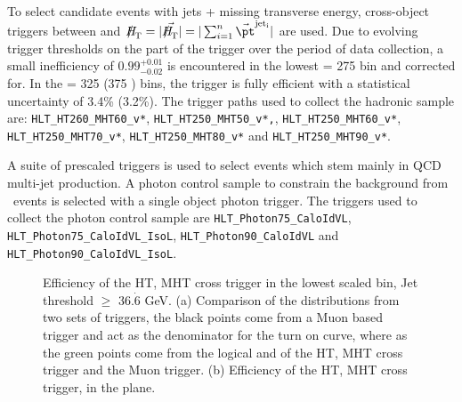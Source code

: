 To select candidate events with jets + missing transverse energy,
cross-object triggers between \HT and $\mht = |\vec{\mht}| =
|\sum_{i=1}^{n} \vec{\pt}^{\rm jet_i}|$ are used.  Due to evolving
trigger thresholds on the \mht part of the trigger over the period of
data collection, a small inefficiency of $0.99^{+0.01}_{-0.02} $ is
encountered in the lowest \HT = 275 \gev bin and corrected for.  In
the \HT = 325 \gev (375 \gev) bins, the trigger is fully efficient
with a statistical uncertainty of 3.4\% (3.2\%). The trigger paths
used to collect the hadronic sample are: \verb!HLT_HT260_MHT60_v*!,
\verb!HLT_HT250_MHT50_v*,!, \verb!HLT_HT250_MHT60_v*!,
\verb!HLT_HT250_MHT70_v*!, \verb!HLT_HT250_MHT80_v*! and
\verb!HLT_HT250_MHT90_v*!.

A suite of prescaled \HT triggers is used to select events which stem
mainly in QCD multi-jet production.  A photon control sample to
constrain the background from \znunu\ events is selected with a single
object photon trigger. The triggers used to collect the photon control
sample are \verb!HLT_Photon75_CaloIdVL!,
\verb!HLT_Photon75_CaloIdVL_IsoL!, \verb!HLT_Photon90_CaloIdVL! and
\verb!HLT_Photon90_CaloIdVL_IsoL!.

\begin{figure}[h!]
    \centering
     \caption{Efficiency of the HT, MHT cross trigger in the lowest
       scaled bin, Jet \PT threshold $\geq $ 36.$\dot{6}$ GeV.  (a)
       Comparison of the \alt distributions from two sets of triggers,
       the black points come from a Muon based trigger and act as the
       denominator for the turn on curve, where as the green points
       come from the logical and of the HT, MHT cross trigger and the
       Muon trigger. (b) Efficiency of the HT, MHT cross trigger, in
       the \alt plane.}
\end{figure}

